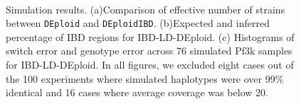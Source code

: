 \documentclass[9pt,lineno]{elife}
\begin{document}
\begin{figure}[htp]
  \centering{}
  \\
  \caption{Simulation results. (a)Comparison of effective number of strains between \texttt{DEploid} and \texttt{DEploidIBD}. (b)Expected and inferred percentage of IBD regions for IBD-LD-DEploid. (c) Histograms of switch error and genotype error across 76 simulated Pf3k samples for IBD-LD-DEploid. In all figures, we excluded eight cases out of the 100 experiments where simulated haplotypes were over 99\% identical and 16 cases where average coverage was below 20.
}\label{fig:benchmark}
\end{figure}
\end{document}

